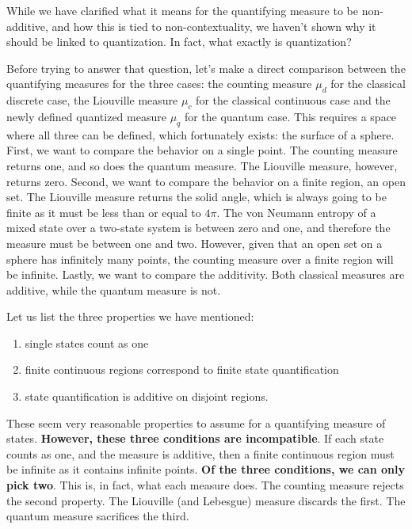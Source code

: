 \documentclass[10pt,twocolumn, nofootinbib]{revtex4-2}
\begin{document}
While we have clarified what it means for the quantifying measure to be non-additive, and how this is tied to non-contextuality, we haven't shown why it should be linked to quantization. In fact, what exactly is quantization?

Before trying to answer that question, let's make a direct comparison between the quantifying measures for the three cases: the counting measure $\mu_d$ for the classical discrete case, the Liouville measure $\mu_c$ for the classical continuous case and the newly defined quantized measure $\mu_q$ for the quantum case. This requires a space where all three can be defined, which fortunately exists: the surface of a sphere. First, we want to compare the behavior on a single point. The counting measure returns one, and so does the quantum measure. The Liouville measure, however, returns zero. Second, we want to compare the behavior on a finite region, an open set. The Liouville measure returns the solid angle, which is always going to be finite as it must be less than or equal to $4\pi$. The von Neumann entropy of a mixed state over a two-state system is between zero and one, and therefore the measure must be between one and two. However, given that an open set on a sphere has infinitely many points, the counting measure over a finite region will be infinite. Lastly, we want to compare the additivity. Both classical measures are additive, while the quantum measure is not.

Let us list the three properties we have mentioned:
\begin{enumerate}
	\item single states count as one
	\item finite continuous regions correspond to finite state quantification
	\item state quantification is additive on disjoint regions.
\end{enumerate}
These seem very reasonable properties to assume for a quantifying measure of states. \textbf{However, these three conditions are incompatible}. If each state counts as one, and the measure is additive, then a finite continuous region must be infinite as it contains infinite points. \textbf{Of the three conditions, we can only pick two}. This is, in fact, what each measure does. The counting measure rejects the second property. The Liouville (and Lebesgue) measure discards the first. The quantum measure sacrifices the third.
\end{document}
